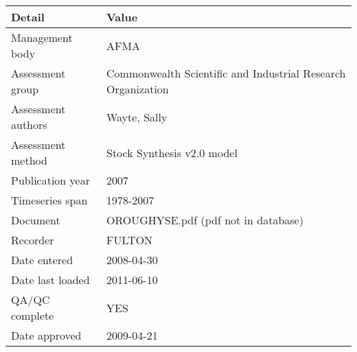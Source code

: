 \begin{table}[htb]
\centering
\begin{tabular}{lp{7cm}}
\toprule
Detail & Value \\
\midrule
Management body    & AFMA                                                         \\
Assessment group   & Commonwealth Scientific and Industrial Research Organization \\
Assessment authors & Wayte, Sally                                                 \\
Assessment method  & Stock Synthesis v2.0 model                                   \\
Publication year   & 2007                                                         \\
Timeseries span    & 1978-2007                                                    \\
Document           & OROUGHYSE.pdf (pdf not in database)                          \\
Recorder           & FULTON                                                       \\
Date entered       & 2008-04-30                                                   \\
Date last loaded   & 2011-06-10                                                   \\
QA/QC complete     & YES                                                          \\
Date approved      & 2009-04-21                                                   \\
\bottomrule
\end{tabular}
\label{tab:assessdet}
\end{table}
